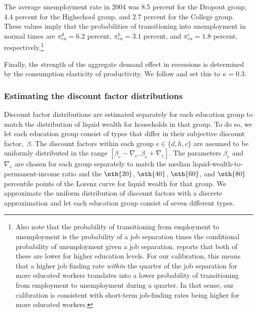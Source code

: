 \documentclass[\econtexRoot/HAFiscal]{subfiles}
\begin{document}
The average unemployment rate in 2004 was 8.5 percent for the Dropout group, 4.4 percent for the Highschool group, and 2.7 percent for the College group. These values imply that the probabilities of transitioning into unemployment in normal times are $\pi_{eu}^d=6.2$ percent, $\pi_{eu}^h=3.1$ percent, and $\pi_{eu}^c=1.8$ percent, respectively.\footnote{Also note that the probability of transitioning from employment to unemployment is the probability of a job separation times the conditional probability of unemployment given a job separation. \citet{mincer1991education} reports that both of these are lower for higher education levels. For our calibration, this means that a higher job finding rate \textit{within} the quarter of the job separation for more educated workers translates	into a lower probability of transitioning from employment to unemployment during a quarter. In that sense, our calibration is consistent with short-term job-finding rates being higher for more educated workers.}

Finally, the strength of the aggregate demand effect in recessions is determined by the consumption elasticity of productivity. We follow \cite{kmpHandbook2016} and set this to $\kappa=0.3$. 


\hypertarget{estimating-the-discount-factor-distributions}{}\par\subsubsection{Estimating the discount factor distributions} 
\notinsubfile{\label{sec:estimBetas}}

Discount factor distributions are estimated separately for each education group to match the distribution of liquid wealth for households in that group. To do so, we let each education group consist of types that differ in their subjective discount factor,~$\beta$. The discount factors within each group $e\in \{d, h, c\}$ are assumed to be uniformly distributed in the range $[\beta_e-\nabla_e, \beta_e+\nabla_e]$. The parameters $\beta_e$ and $\nabla_e$ are chosen for each group separately to match the median liquid-wealth-to-permanent-income ratio and the $\nth{20}$, $\nth{40}$, $\nth{60}$, and $\nth{80}$ percentile points of the Lorenz curve for liquid wealth for that group. We approximate the uniform distribution of discount factors with a discrete approximation and let each education group consist of seven different types.
\end{document}
